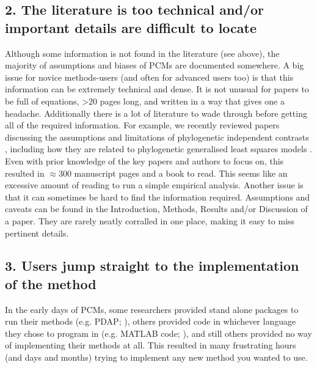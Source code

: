 \documentclass[a4paper,12pt]{article}
\begin{document}
  \subsection{2. The literature is too technical and/or important details are difficult to locate}
    Although some information is not found in the literature (see above), the majority of assumptions and biases of PCMs are documented somewhere. 
    A big issue for novice methods-users (and often for advanced users too) is that this information can be extremely technical and dense.
    It is not unusual for papers to be full of equations, \textgreater 20 pages long, and written in a way that gives one a headache. 
    Additionally there is a lot of literature to wade through before getting all of the required information. 
    For example, we recently reviewed papers discussing the assumptions and limitations of phylogenetic independent contrasts \citep{felsenstein1985phylogenies}, including how they are related to phylogenetic generalised least squares models \citep{garland2000using,rohle2006comment,blomberg2012independent}. 
    Even with prior knowledge of the key papers and authors to focus on, this resulted in $\approx 300$ manuscript pages and a book to read.
    This seems like an excessive amount of reading to run a simple empirical analysis.
    Another issue is that it can sometimes be hard to find the information required. 
    Assumptions and caveats can be found in the Introduction, Methods, Results and/or Discussion of a paper. 
    They are rarely neatly corralled in one place, making it easy to miss pertinent details. 

  \subsection{3. Users jump straight to the implementation of the method}
    In the early days of PCMs, some researchers provided stand alone packages to run their methods (e.g. PDAP; \citealp{diaz1996testing}), others provided code in whichever language they chose to program in (e.g. MATLAB code; \citealp{rohlf2001comparative}), and still others provided no way of implementing their methods at all. 
    This resulted in many frustrating hours (and days and months) trying to implement any new method you wanted to use.\\
\end{document}
